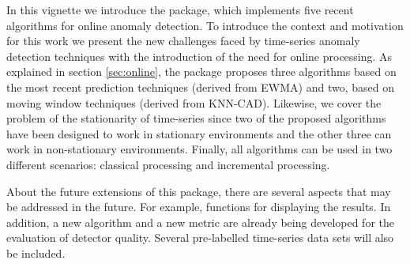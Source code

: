 \documentclass[a4paper]{article}\usepackage[]{graphicx}\usepackage[]{color}
\begin{document}
In this vignette we introduce the  package, which implements five recent algorithms for online anomaly detection. To introduce the context and motivation for this work we present the new challenges faced by time-series anomaly detection techniques with the introduction of the need for online processing. As explained in section \ref{sec:online}, the package proposes three algorithms based on the most recent prediction techniques (derived from EWMA) and two, based on moving window techniques (derived from KNN-CAD). Likewise, we cover the problem of the stationarity of time-series since two of the proposed algorithms have been designed to work in stationary environments and the other three can work in non-stationary environments. Finally, all algorithms can be used in two different scenarios: classical processing and incremental processing.

About the future extensions of this package, there are several aspects that may be addressed in the future. For example, functions for displaying the results. In addition, a new algorithm and a new metric are already being developed for the evaluation of detector quality. Several pre-labelled time-series data sets will also be included.



\end{document}
